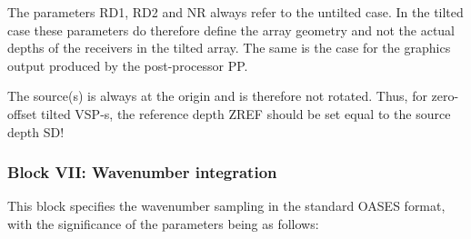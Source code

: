 The parameters RD1, RD2 and NR always refer to the untilted case. 
In the tilted case these parameters do therefore define the array
geometry and not the actual depths of the receivers in the tilted array.
The same is the case for the graphics output produced by the
post-processor PP. 


The source(s) is always at the origin and is therefore not rotated.
Thus, for zero-offset tilted VSP-s, the reference depth ZREF should be set 
equal to the source depth SD!



\subsubsection{Block VII: Wavenumber integration}

This block specifies the wavenumber sampling in the standard OASES
format, with the significance of the parameters being as follows:
